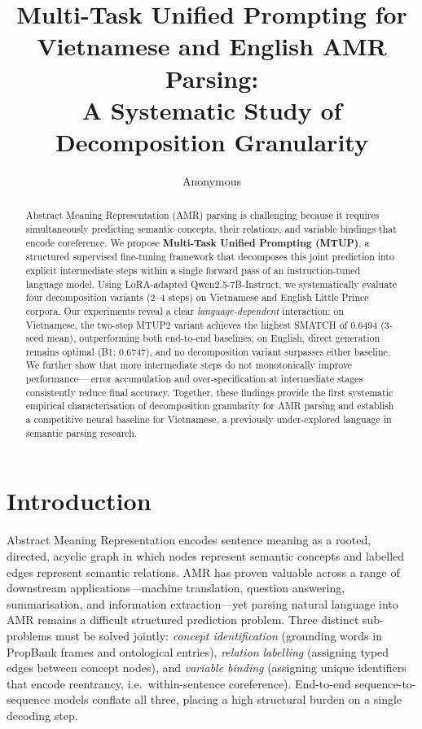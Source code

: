 \documentclass[11pt,a4paper]{article}
\title{\textbf{Multi-Task Unified Prompting for Vietnamese and English AMR Parsing:\\
A Systematic Study of Decomposition Granularity}}
\author{Anonymous}
\date{}
\begin{document}
\maketitle

\begin{abstract}
Abstract Meaning Representation (AMR) parsing is challenging because it requires
simultaneously predicting semantic concepts, their relations, and variable
bindings that encode coreference. We propose \textbf{Multi-Task Unified Prompting
(MTUP)}, a structured supervised fine-tuning framework that decomposes this joint
prediction into explicit intermediate steps within a single forward pass of an
instruction-tuned language model. Using LoRA-adapted Qwen2.5-7B-Instruct, we
systematically evaluate four decomposition variants (2--4 steps) on Vietnamese
and English Little Prince corpora. Our experiments reveal a clear
\emph{language-dependent} interaction: on Vietnamese, the two-step MTUP2 variant
achieves the highest SMATCH of 0.6494 (3-seed mean), outperforming both
end-to-end baselines; on English, direct generation remains optimal (B1:
0.6747), and no decomposition variant surpasses either baseline. We further
show that more intermediate steps do not monotonically improve performance---
error accumulation and over-specification at intermediate stages consistently
reduce final accuracy. Together, these findings provide the first systematic
empirical characterisation of decomposition granularity for AMR parsing and
establish a competitive neural baseline for Vietnamese, a previously
under-explored language in semantic parsing research.
\end{abstract}

\section{Introduction}
\label{sec:intro}

Abstract Meaning Representation \citep{banarescu2013abstract} encodes sentence
meaning as a rooted, directed, acyclic graph in which nodes represent semantic
concepts and labelled edges represent semantic relations. AMR has proven
valuable across a range of downstream applications---machine translation,
question answering, summarisation, and information extraction---yet parsing
natural language into AMR remains a difficult structured prediction problem.
Three distinct sub-problems must be solved jointly: \emph{concept identification}
(grounding words in PropBank frames and ontological entries), \emph{relation
labelling} (assigning typed edges between concept nodes), and \emph{variable
binding} (assigning unique identifiers that encode reentrancy, i.e.\
within-sentence coreference). End-to-end sequence-to-sequence models conflate
all three, placing a high structural burden on a single decoding step.
\end{document}
